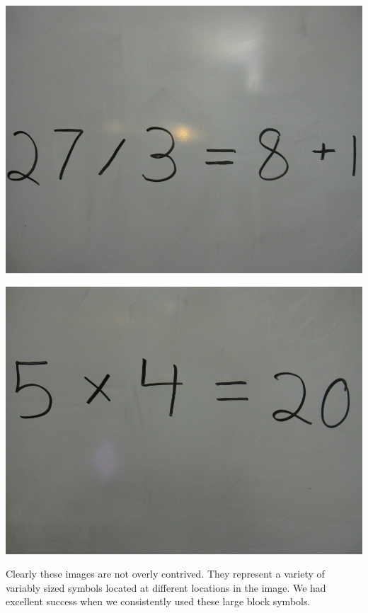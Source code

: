 \begin{minipage}[h!]{.9\linewidth}
\begin{minipage}[h!]{0.49\textwidth}
\end{minipage}
\vfill
\begin{minipage}[h!]{0.49\textwidth}%
\includegraphics[width=\textwidth]{images/img_003.jpg}
\end{minipage}
\begin{minipage}[h!]{0.49\textwidth}%
\includegraphics[width=\linewidth]{images/img_004.jpg}
\end{minipage}
\vspace{5 mm}
\end{minipage}

Clearly these images are not overly contrived. They represent a variety of variably sized symbols located at different locations in the image. We had excellent success when we consistently used these large block symbols.

